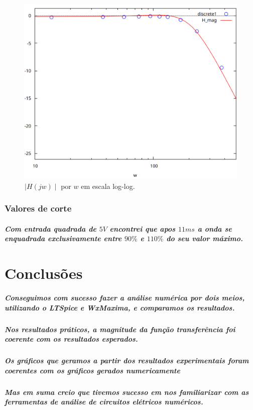 \documentclass[12pt,twoside, a4paper, twocolumn]{article}
\begin{document}
\begin{figure}[h]
    \centering
    \includegraphics[width=1\columnwidth]{images/H2loglog.png}
    \caption{ $\mid H(jw) \mid$ por $w$ em escala log-log.}
\end{figure}




\subsubsection{Valores de corte}


\subparagraph*{Com entrada quadrada de $5V$ encontrei que apos $11ms$ a onda se enquadrada exclusivamente entre $90\%$ e $110\%$ do seu valor máximo.}


\newpage


\section{Conclusões}




\subparagraph*{Conseguimos com sucesso fazer a análise numérica por dois meios, utilizando o LTSpice e WxMaxima, e comparamos os resultados.}


\subparagraph*{Nos resultados práticos, a magnitude da função transferência foi coerente com os resultados esperados.}




\subparagraph*{Os gráficos que geramos a partir dos resultados experimentais foram coerentes com os gráficos gerados numericamente}


\subparagraph*{Mas em suma creio que tivemos sucesso em nos familiarizar com as ferramentas de análise de circuitos elétricos numéricos.}
\end{document}
